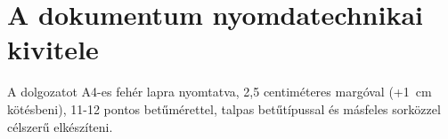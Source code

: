 \section{A dokumentum nyomdatechnikai kivitele}
A dolgozatot A4-es fehér lapra nyomtatva, 2,5 centiméteres margóval (+1~cm kötésbeni), 11-12 pontos betűmérettel, talpas betűtípussal és másfeles sorközzel célszerű elkészíteni.

